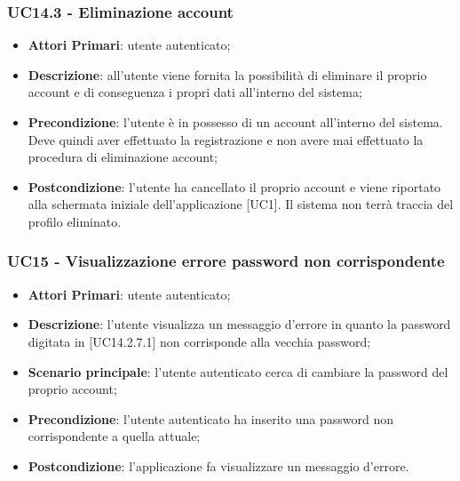 
\subsubsection{UC14.3 - Eliminazione account}
\begin{itemize}
	\item \textbf{Attori Primari}: utente autenticato;
	\item \textbf{Descrizione}: all'utente viene fornita la possibilità di eliminare il proprio account e di conseguenza i propri dati all'interno del sistema;
	\item \textbf{Precondizione}: l'utente è in possesso di un account all'interno del sistema. Deve quindi aver effettuato la registrazione e non avere mai effettuato la procedura di eliminazione account;
	\item \textbf{Postcondizione}: l'utente ha cancellato il proprio account e viene riportato alla schermata iniziale dell'applicazione [UC1]. Il sistema non terrà traccia del profilo eliminato.
\end{itemize}

\subsubsection{UC15 - Visualizzazione errore password non corrispondente}
\begin{itemize}
	\item \textbf{Attori Primari}: utente autenticato;
	\item \textbf{Descrizione}: l'utente visualizza un messaggio d'errore in quanto la password digitata in [UC14.2.7.1] non corrisponde alla vecchia password;
	\item \textbf{Scenario principale}: l'utente autenticato cerca di cambiare la password del proprio account;
	\item \textbf{Precondizione}: l'utente autenticato ha inserito una password non corrispondente a quella attuale;
	\item \textbf{Postcondizione}: l'applicazione fa visualizzare un messaggio d'errore.
\end{itemize}



